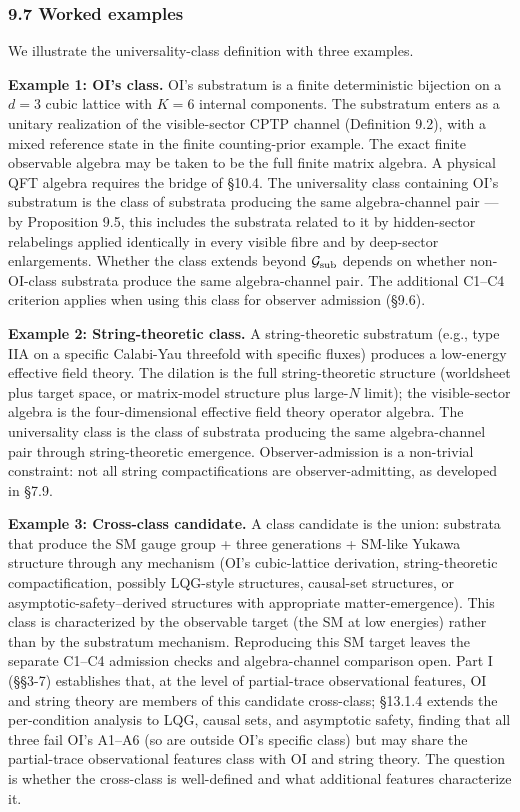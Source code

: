 \documentclass[
]{article}
\begin{document}
\hypertarget{worked-examples}{%
\subsubsection{9.7 Worked examples}\label{worked-examples}}

We illustrate the universality-class definition with three examples.

\textbf{Example 1: OI's class.} OI's substratum is a finite
deterministic bijection on a \(d=3\) cubic lattice with \(K=6\) internal
components. The substratum enters as a unitary realization of the
visible-sector CPTP channel (Definition 9.2), with a mixed reference
state in the finite counting-prior example. The exact finite observable
algebra may be taken to be the full finite matrix algebra. A physical
QFT algebra requires the bridge of §10.4. The universality class
containing OI's substratum is the class of substrata producing the same
algebra-channel pair --- by Proposition 9.5, this includes the substrata
related to it by hidden-sector relabelings applied identically in every
visible fibre and by deep-sector enlargements. Whether the class extends
beyond \(\mathcal{G}_{\rm sub}\) depends on whether non-OI-class
substrata produce the same algebra-channel pair. The additional C1--C4
criterion applies when using this class for observer admission (§9.6).

\textbf{Example 2: String-theoretic class.} A string-theoretic
substratum (e.g., type IIA on a specific Calabi-Yau threefold with
specific fluxes) produces a low-energy effective field theory. The
dilation is the full string-theoretic structure (worldsheet plus target
space, or matrix-model structure plus large-\(N\) limit); the
visible-sector algebra is the four-dimensional effective field theory
operator algebra. The universality class is the class of substrata
producing the same algebra-channel pair through string-theoretic
emergence. Observer-admission is a non-trivial constraint: not all
string compactifications are observer-admitting, as developed in §7.9.

\textbf{Example 3: Cross-class candidate.} A class candidate is the
union: substrata that produce the SM gauge group + three generations +
SM-like Yukawa structure through any mechanism (OI's cubic-lattice
derivation, string-theoretic compactification, possibly LQG-style
structures, causal-set structures, or asymptotic-safety--derived
structures with appropriate matter-emergence). This class is
characterized by the observable target (the SM at low energies) rather
than by the substratum mechanism. Reproducing this SM target leaves the
separate C1--C4 admission checks and algebra-channel comparison open.
Part I (§§3-7) establishes that, at the level of partial-trace
observational features, OI and string theory are members of this
candidate cross-class; §13.1.4 extends the per-condition analysis to
LQG, causal sets, and asymptotic safety, finding that all three fail
OI's A1--A6 (so are outside OI's specific class) but may share the
partial-trace observational features class with OI and string theory.
The question is whether the cross-class is well-defined and what
additional features characterize it.
\end{document}
